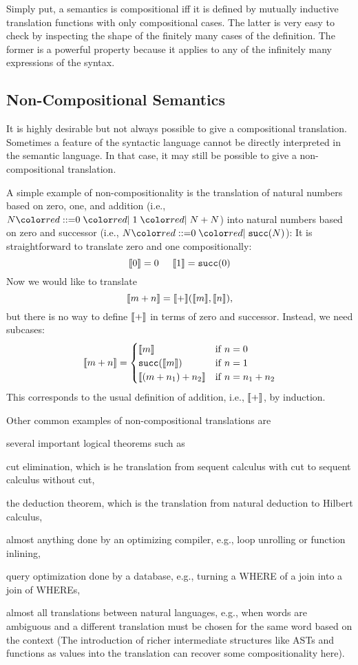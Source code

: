 Simply put, a semantics is compositional iff it is defined by mutually inductive translation functions with only compositional cases.
The latter is very easy to check by inspecting the shape of the finitely many cases of the definition.
The former is a powerful property because it applies to any of the infinitely many expressions of the syntax.

\subsection{Non-Compositional Semantics}

It is highly desirable but not always possible to give a compositional translation.
Sometimes a feature of the syntactic language cannot be directly interpreted in the semantic language.
In that case, it may still be possible to give a non-compositional translation.

\begin{example}
A simple example of non-compositionality is the translation of natural numbers based on zero, one, and addition (i.e., $N\bbc 0\bnfalt 1\bnfalt N+N$) into natural numbers based on zero and successor (i.e., $N\bbc 0\bnfalt\cn{succ}(N)$):
It is straightforward to translate zero and one compositionally:
\[\llbracket 0\rrbracket=0 \hspace*{.5cm}\llbracket 1\rrbracket=\mathtt{succ}(0)\]
Now we would like to translate \[\llbracket m+n\rrbracket=\llbracket +\rrbracket(\llbracket m\rrbracket,\llbracket n\rrbracket),\] but there is no way to define $\llbracket +\rrbracket$ in terms of zero and successor.
Instead, we need subcases:
\[\llbracket m+n\rrbracket=\begin{cases}\llbracket m\rrbracket&\mathrm{if}\; n=0 \\ \mathtt{succ}(\llbracket m\rrbracket)&\mathrm{if}\; n=1 \\ \llbracket (m+n_1)+n_2\rrbracket&\mathrm{if}\; n=n_1+n_2\end{cases}\]
This corresponds to the usual definition of addition, i.e., $\llbracket +\rrbracket$, by induction.
\end{example}

Other common examples of non-compositional translations are
\begin{compactitem}
 \item several important logical theorems such as
  \begin{compactitem}
   \item cut elimination, which is he translation from sequent calculus with cut to sequent calculus without cut,
   \item the deduction theorem, which is the translation from natural deduction to Hilbert calculus,
  \end{compactitem}
 \item almost anything done by an optimizing compiler, e.g., loop unrolling or function inlining,
 \item query optimization done by a database, e.g., turning a WHERE of a join into a join of WHEREs,
 \item almost all translations between natural languages, e.g., when words are ambiguous and a different translation must be chosen for the same word based on the context (The introduction of richer intermediate structures like ASTs and functions as values into the translation can recover some compositionality here).
\end{compactitem}

